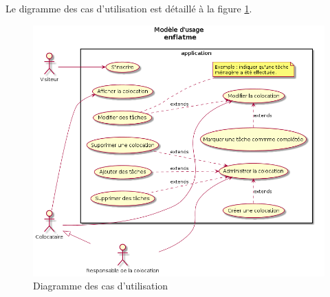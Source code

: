 Le digramme des cas d'utilisation est détaillé à la figure \ref{fig:diagCasUtil}.
\begin{center}
	\begin{figure}[h]
		\includegraphics[scale=0.6]{../casUtilisation/casUtilisation.png}
		\caption{\label{fig:diagCasUtil}Diagramme des cas d'utilisation}
	\end{figure}
\end{center}